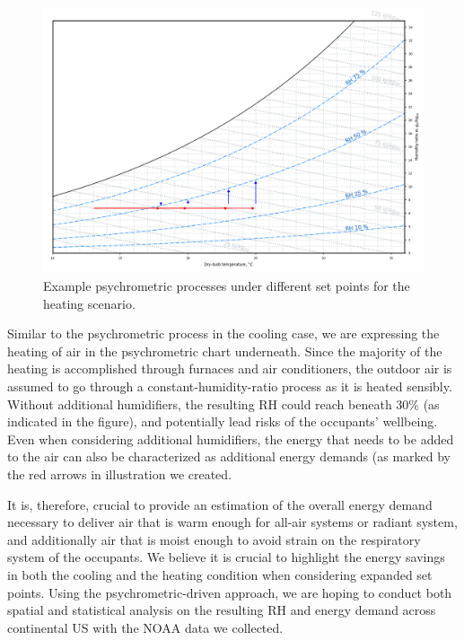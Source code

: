     \begin{figure}[h!]
    \centering
    \includegraphics[width=\textwidth]{heatingcases.png}
    \caption{Example psychrometric processes under different set points for the heating scenario.}\label{fg:heat}
    \end{figure}

    Similar to the psychrometric process in the cooling case, we are expressing the heating of air in the psychrometric chart underneath. Since the majority of the heating is accomplished through furnaces and air conditioners, the outdoor air is assumed to go through a constant-humidity-ratio process as it is heated sensibly. Without additional humidifiers, the resulting RH could reach beneath 30\% (as indicated in the figure), and potentially lead risks of the occupants’ wellbeing. Even when considering additional humidifiers, the energy that needs to be added to the air can also be characterized as additional energy demands (as marked by the red arrows in illustration we created. %

    It is, therefore, crucial to provide an estimation of the overall energy demand necessary to deliver air that is warm enough for all-air systems or radiant system, and additionally air that is moist enough to avoid strain on the respiratory system of the occupants. We believe it is crucial to highlight the energy savings in both the cooling and the heating condition when considering expanded set points. Using the psychrometric-driven approach, we are hoping to conduct both spatial and statistical analysis on the resulting RH and energy demand across continental US with the NOAA data we collected. %


